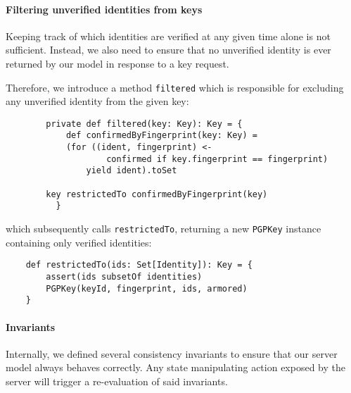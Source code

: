 \paragraph{Filtering unverified identities from keys}
Keeping track of which identities are verified at any given time alone is not sufficient. Instead, we also need to ensure that no unverified identity is ever returned by our model in response to a key request. 

Therefore, we introduce a method \texttt{filtered} which is responsible for excluding any unverified identity from the given key: 
\begin{code}
    \begin{verbatim}
        private def filtered(key: Key): Key = {
            def confirmedByFingerprint(key: Key) =
            (for ((ident, fingerprint) <- 
                    confirmed if key.fingerprint == fingerprint)
                yield ident).toSet
        
        key restrictedTo confirmedByFingerprint(key)
          }
    \end{verbatim}
\end{code}
which subsequently calls \texttt{restrictedTo}, returning a new \texttt{PGPKey} instance containing only verified identities:
\begin{code}
    \begin{verbatim}
    def restrictedTo(ids: Set[Identity]): Key = {
        assert(ids subsetOf identities)
        PGPKey(keyId, fingerprint, ids, armored)
    }
    \end{verbatim}
\end{code}


\paragraph{Invariants} 
Internally, we defined several consistency invariants to ensure that our server model always behaves correctly. 
Any state manipulating action exposed by the server will trigger a re-evaluation of said invariants.

